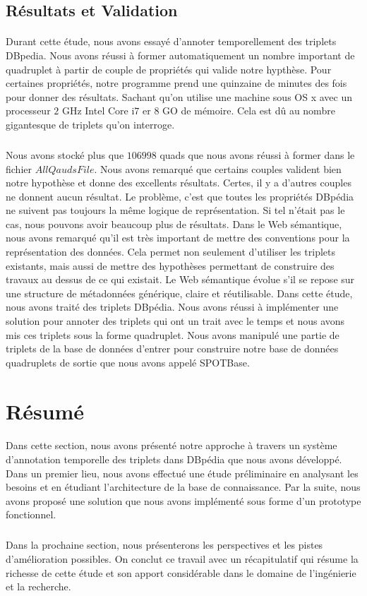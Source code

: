 \documentclass[12pt,a4	]{report}
\begin{document}
\subsection{Résultats et Validation}
\paragraph{}
Durant cette étude, nous avons essayé d'annoter temporellement des triplets DBpedia. Nous avons réussi à former automatiquement un nombre important de quadruplet à partir de couple de propriétés qui valide notre hypthèse. Pour certaines propriétés, notre programme prend une quinzaine de minutes des fois pour donner des résultats. Sachant qu'on utilise une machine sous OS x avec un processeur $2$ GHz Intel Core i$7$ er $8$ GO de mémoire. Cela est dû au nombre gigantesque de triplets qu'on interroge.
\subparagraph{}
Nous avons stocké plus que $106998$ quads que nous avons réussi à former dans le fichier $AllQaudsFile$. Nous avons remarqué que certains couples valident bien notre hypothèse et donne des excellents résultats. Certes, il y a d'autres couples ne donnent aucun résultat. Le problème, c'est que toutes les propriétés DBpédia ne suivent pas toujours la même logique de représentation. Si tel n'était pas le cas, nous pouvons avoir beaucoup plus de résultats.
Dans le Web sémantique, nous avons remarqué qu'il est très important de mettre des conventions pour la représentation des données. Cela permet non seulement d'utiliser les triplets existants, mais aussi de mettre des hypothèses permettant de construire des travaux au dessus de ce qui existait. Le Web sémantique évolue s'il se repose sur une structure de métadonnées générique, claire et réutilisable. Dans cette étude, nous avons traité des triplets DBpédia. Nous avons réussi à implémenter une solution pour annoter des triplets qui ont un trait avec le temps et nous avons mis ces triplets sous la forme quadruplet. Nous avons manipulé une partie de triplets de la base de données d'entrer pour construire notre base de données quadruplets de sortie que nous avons appelé SPOTBase.
\section{Résumé}
\paragraph{}
Dans cette section, nous avons présenté notre approche à travers un système d'annotation temporelle des triplets dans DBpédia que nous avons développé. Dans un premier lieu, nous avons effectué une étude préliminaire en analysant les besoins et en étudiant l'architecture de la base de connaissance.
Par la suite, nous avons proposé une solution que nous avons implémenté sous forme d'un prototype fonctionnel.
\subparagraph{}
Dans la prochaine section, nous présenterons les perspectives et les pistes d'amélioration possibles. On conclut ce travail avec un récapitulatif qui résume la richesse de cette étude et son apport considérable dans le domaine de l'ingénierie et la recherche.  

\end{document}
